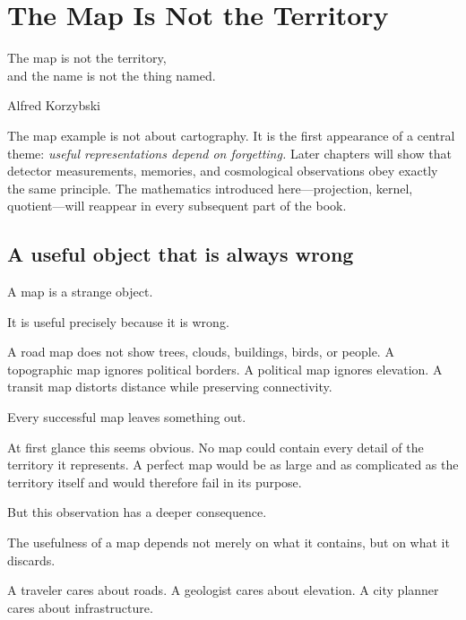 
\chapter{The Map Is Not the Territory}
\label{ch:map}

\epigraph{%
  The map is not the territory,\\
  and the name is not the thing named.%
}{Alfred Korzybski}

\bigskip

\begin{WhyMatters}
  The map example is not about cartography.
  It is the first appearance of a central theme:
  \emph{useful representations depend on forgetting.}
  Later chapters will show that detector measurements, memories,
  and cosmological observations obey exactly the same principle.
  The mathematics introduced here---projection, kernel,
  quotient---will reappear in every subsequent part of the book.
\end{WhyMatters}

\section{A useful object that is always wrong}

A map is a strange object.

It is useful precisely because it is wrong.

A road map does not show trees, clouds, buildings, birds, or people.
A topographic map ignores political borders.
A political map ignores elevation.
A transit map distorts distance while preserving connectivity.

Every successful map leaves something out.

At first glance this seems obvious.
No map could contain every detail of the territory it represents.
A perfect map would be as large and as complicated as the territory
itself and would therefore fail in its purpose.

But this observation has a deeper consequence.

The usefulness of a map depends not merely on what it contains,
but on what it discards.

A traveler cares about roads.
A geologist cares about elevation.
A city planner cares about infrastructure.

